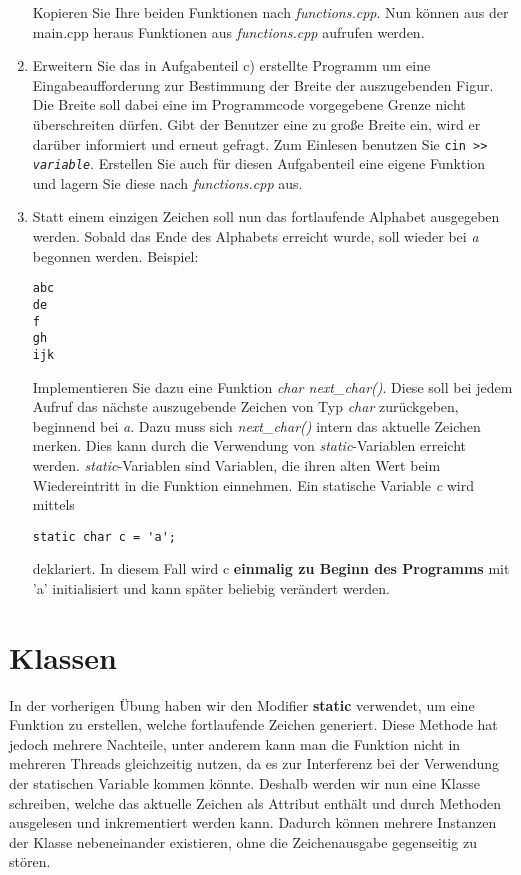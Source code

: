 \documentclass[
  accentcolor=tud1c,	%
  colorbacktitle,		%
  inverttitle,			%
  german,				%
  twoside
]{tudexercise}
\begin{document}
\begin{enumerate}
Kopieren Sie Ihre beiden Funktionen nach \emph{functions.cpp}. Nun können aus der main.cpp heraus Funktionen aus \emph{functions.cpp} aufrufen werden.

\item Erweitern Sie das in Aufgabenteil c) erstellte Programm um eine Eingabeaufforderung zur Bestimmung der Breite der auszugebenden Figur. Die Breite soll dabei
eine im Programmcode vorgegebene Grenze nicht überschreiten dürfen. Gibt der Benutzer eine zu große Breite ein, wird er darüber informiert und erneut gefragt. Zum Einlesen benutzen Sie \texttt{cin >{}> \textit{variable}}. Erstellen Sie auch für diesen Aufgabenteil eine eigene Funktion und lagern Sie diese nach \emph{functions.cpp} aus.

\item Statt einem einzigen Zeichen soll nun das fortlaufende Alphabet ausgegeben werden. Sobald das Ende des Alphabets erreicht wurde, soll wieder bei \emph{a} begonnen werden. Beispiel:
\begin{lstlisting}
abc
de
f
gh
ijk
\end{lstlisting}

Implementieren Sie dazu eine Funktion \emph{char next\_char()}. Diese soll bei jedem Aufruf das nächste auszugebende Zeichen von Typ \emph{char} zurückgeben, beginnend bei \emph{\textquotesingle a\textquotesingle}. Dazu muss sich \emph{next\_char()} intern das aktuelle Zeichen merken. Dies kann durch die Verwendung von \emph{static}-Variablen erreicht werden. \emph{static}-Variablen sind Variablen, die ihren alten Wert beim Wiedereintritt in die Funktion einnehmen. Ein statische Variable \emph{c} wird mittels 
\begin{lstlisting}
static char c = 'a';
\end{lstlisting}
deklariert. In diesem Fall wird c \textbf{einmalig zu Beginn des Programms} mit 'a' initialisiert und kann später beliebig verändert werden.\\
\end{enumerate} 

\section{Klassen}

In der vorherigen Übung haben wir den Modifier \textbf{static} verwendet, um eine Funktion zu erstellen, welche fortlaufende Zeichen generiert. Diese Methode hat jedoch mehrere Nachteile, unter anderem kann man die Funktion nicht in mehreren Threads gleichzeitig nutzen, da es zur Interferenz bei der Verwendung der statischen Variable kommen könnte. Deshalb werden wir nun eine Klasse schreiben, welche das aktuelle Zeichen als Attribut enthält und durch Methoden ausgelesen und inkrementiert werden kann. Dadurch können mehrere Instanzen der Klasse nebeneinander existieren, ohne die Zeichenausgabe gegenseitig zu stören.
\end{document}
